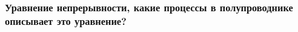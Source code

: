\subsubsection{Уравнение непрерывности, какие процессы в полупроводнике описывает это уравнение?}

\pagebreak
